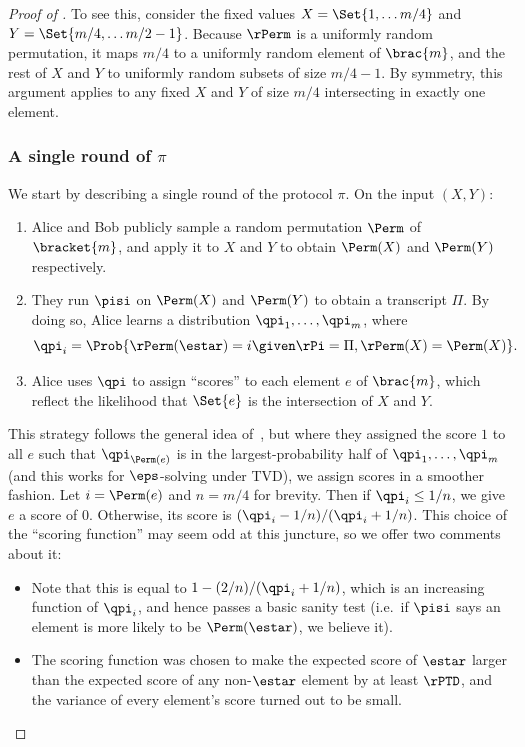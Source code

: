 \begin{proof}[Proof of ]
To see this, consider the fixed values $X = \Set{1, \ldots m / 4}$ and
$Y = \Set{m / 4, \ldots m / 2 - 1}$.
Because $\rPerm$ is a uniformly random permutation, it maps $m / 4$ to a
uniformly random element of $\brac{m}$, and the rest of $X$ and $Y$ to
uniformly random subsets of size $m / 4 - 1$.
By symmetry, this argument applies to any fixed $X$ and $Y$ of size $m / 4$
intersecting in exactly one element.


\subsubsection{A single round of \texorpdfstring{$\pi$}{the protocol}}\label{subsec:single-round}

We start by describing a single round of the protocol $\pi$.
On the input $(X, Y)$:
\begin{enumerate}
  \item Alice and Bob publicly sample a random permutation $\Perm$ of
    $\bracket{m}$, and apply it to $X$ and $Y$ to obtain $\Perm(X)$ and
    $\Perm(Y)$ respectively.
  \item They run $\pisi$ on $\Perm(X)$ and $\Perm(Y)$ to obtain a transcript
    $\Pi$.
    By doing so, Alice learns a distribution $\qpi_1, \ldots , \qpi_m$, where
    \[ \qpi_i = \Prob{ \rPerm(\estar) = i \given \rPi = \Pi, \rPerm(X) = \Perm(X)} . \]
  \item Alice uses $\qpi$ to assign ``scores'' to each element $e$ of
    $\brac{m}$, which reflect the likelihood that $\Set{e}$ is the
    intersection of $X$ and $Y$.
\end{enumerate}

This strategy follows the general idea of~\cite{AssadiR20}, but where they assigned the score $1$ to all $e$ such that $\qpi_{\Perm(e)}$ is in the largest-probability half of $\qpi_1, \ldots , \qpi_m$ (and this works for $\eps$-solving under TVD), we assign scores in a smoother fashion.
Let $i = \Perm(e)$ and $n = m / 4$ for brevity.
Then if $\qpi_{i} \leq 1/n$, we give $e$ a score of $0$.
Otherwise, its score is $(\qpi_i - 1/n) / (\qpi_i + 1/n)$.
This choice of the ``scoring function'' may seem odd at this juncture, so
we offer two comments about it:
\begin{itemize}
  \item Note that this is equal to $1 - (2 / n) / (\qpi_i + 1/n)$, which is an
    increasing function of $\qpi_i$, and hence passes a basic sanity test
    (i.e.\ if $\pisi$ says an element is more likely to be $\Perm(\estar)$,
    we believe it).
  \item 
    The scoring function was chosen to make the expected score of $\estar$
    larger than the expected score of any non-$\estar$ element by at least
    $\rPTD$, and the variance of every element's score turned out to be small.
\end{itemize}


\end{proof}
